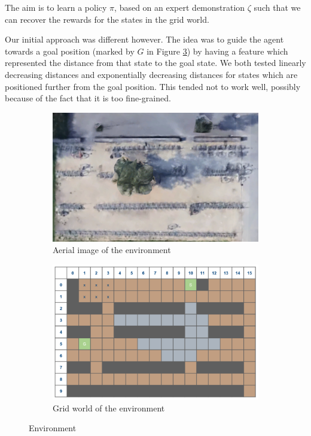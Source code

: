 \documentclass[10pt,a4paper,twocolumn]{article}
\begin{document}
The aim is to learn a policy $\pi$, based on an expert demonstration $\zeta$ such that we can recover the rewards for the states in the grid world.

Our initial approach was different however. The idea was to guide the agent towards a goal position (marked by $G$ in Figure \ref{fig:gridworld}) by having a feature which represented the distance from that state to the goal state.
We both tested linearly decreasing distances and exponentially decreasing distances for states which are positioned further from the goal position. This tended not to work well, possibly because of the fact that it is too fine-grained.

\begin{figure}[h]
\begin{subfigure}[b]{0.5\textwidth}
	\includegraphics[width=\textwidth]{google}
	\caption{Aerial image of the environment}
	\label{fig:google}
\end{subfigure}
\begin{subfigure}[b]{0.5\textwidth}
	\includegraphics[width=\textwidth]{gridworld}
	\caption{Grid world of the environment}
	\label{fig:gridworld}
\end{subfigure}
\caption{Environment}
\end{figure}
\end{document}
